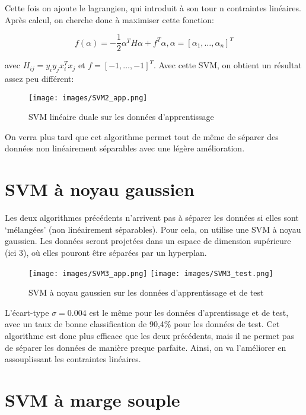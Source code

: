 \documentclass{article}
\begin{document}
Cette fois on ajoute le lagrangien, qui introduit à son tour n contraintes linéaires. Après calcul, on cherche donc à maximiser cette fonction:

\begin{equation}
    f(\alpha) = -\frac{1}{2} \alpha ^T H \alpha + f^T \alpha,   \alpha = [\alpha_1,\ldots,\alpha_n]^T
\end{equation}

avec $H_{ij} = y_i y_j x_i^T x_j$ et $f = [-1,\ldots,-1]^T$. Avec cette SVM, on obtient un résultat assez peu différent:

\begin{figure}[H]
    \centering
    \texttt{[image: images/SVM2\_app.png]}
    \caption{SVM linéaire duale sur les données d'apprentissage}
\end{figure}

On verra plus tard que cet algorithme permet tout de même de séparer des données non linéairement séparables avec une légère amélioration.


\section{SVM à noyau gaussien}

Les deux algorithmes précédents n'arrivent pas à séparer les données si elles sont `mélangées' (non linéairement séparables). Pour cela, on utilise une SVM à noyau gaussien.
Les données seront projetées dans un espace de dimension supérieure (ici 3), où elles pouront être séparées par un hyperplan.

\begin{figure}[H]
    \centering
    \texttt{[image: images/SVM3\_app.png]}
    \texttt{[image: images/SVM3\_test.png]}
    \caption{SVM à noyau gaussien sur les données d'apprentissage et de test}
\end{figure}

L'écart-type $\sigma = 0.004$ est le même pour les données d'aprentissage et de test, avec un taux de bonne classification de 90,4\% pour les données de test.
Cet algorithme est donc plus efficace que les deux précédents, mais il ne permet pas de séparer les données de manière preque parfaite. Ainsi, on va l'améliorer en assouplissant les contraintes linéaires.

\section{SVM à marge souple}
\end{document}
